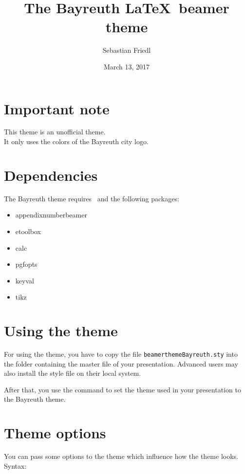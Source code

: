 \documentclass[12pt,a4paper]{scrartcl}
\title{The Bayreuth \LaTeX\ beamer theme}
\author{Sebastian Friedl}
\date{March 13, 2017}
\begin{document}
	\maketitle
	\thispagestyle{empty}
	
	
	\section*{Important note}
	This theme is an unofficial theme. \\
	It only uses the colors of the Bayreuth city logo.
	
		
	\section*{Dependencies}
	The Bayreuth theme requires \LaTeXe\ and the following packages:
	\begin{itemize} \ttfamily
		\item appendixnumberbeamer
		\item etoolbox
		\item calc
		\item pgfopts
		\item keyval
		\item tikz
	\end{itemize}
	
	
	\section{Using the theme}
	For using the theme, you have to copy the file \texttt{beamerthemeBayreuth.sty} into the folder containing the master file of your presentation. Advanced users may also install the style file on their local system. \par
	After that, you use the command \texttt{} to set the theme used in your presentation to the Bayreuth theme.

	
	\section{Theme options}
	You can pass some options to the theme which influence how the theme looks. \\
	Syntax: \ \ \texttt{} \\\vspace{0.5ex}
	
\end{document}
